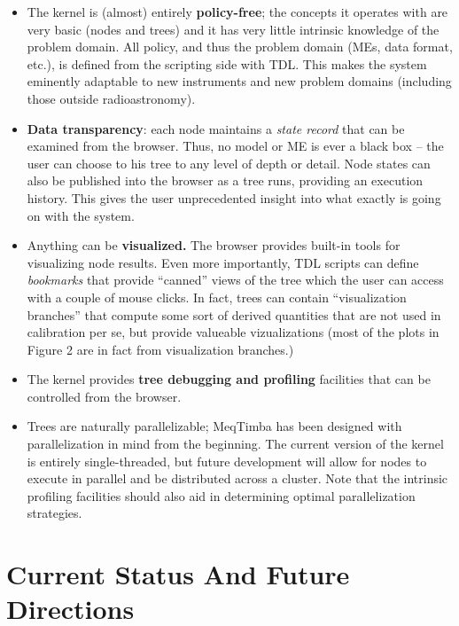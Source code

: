 \documentclass[11pt,twoside]{article}  %
\begin{document}
\begin{itemize}

\item The kernel is (almost) entirely {\bf policy-free}; the concepts it operates with
are very basic (nodes and trees) and it has very little intrinsic knowledge of
the problem domain. All policy, and thus the problem domain (MEs, data format,
etc.), is defined from the scripting side with TDL. This makes the system
eminently adaptable to new instruments and new problem domains (including those
outside radioastronomy).

\item {\bf Data transparency}: each node maintains a {\em state record} that can be
examined from the browser. Thus, no model or ME is ever a black box -- the user
can choose to his tree to any level of depth or detail. Node states can also be
published into the browser as a tree runs, providing an execution history. This
gives the user unprecedented insight into what exactly is going on with the
system.

\item Anything can be {\bf visualized.} The browser provides built-in tools for
visualizing node results. Even more importantly, TDL scripts can define {\em
bookmarks} that provide ``canned'' views of the tree which the user can access
with a couple of mouse clicks. In fact, trees can contain ``visualization
branches'' that compute some sort of derived quantities that are not used in
calibration per se, but  provide valueable vizualizations (most of the plots in
Figure 2 are in fact from visualization branches.)

\item The kernel provides {\bf tree debugging and profiling} facilities that can
be controlled from the browser.

\item Trees are naturally parallelizable; MeqTimba has been designed with
parallelization in mind from the beginning. The current version of the
kernel is entirely single-threaded, but future development will allow for nodes
to execute in parallel and be distributed across a cluster. Note that the
intrinsic profiling facilities should also aid in determining optimal
parallelization strategies.

\end{itemize}

\section{Current Status And Future Directions}
\end{document}
